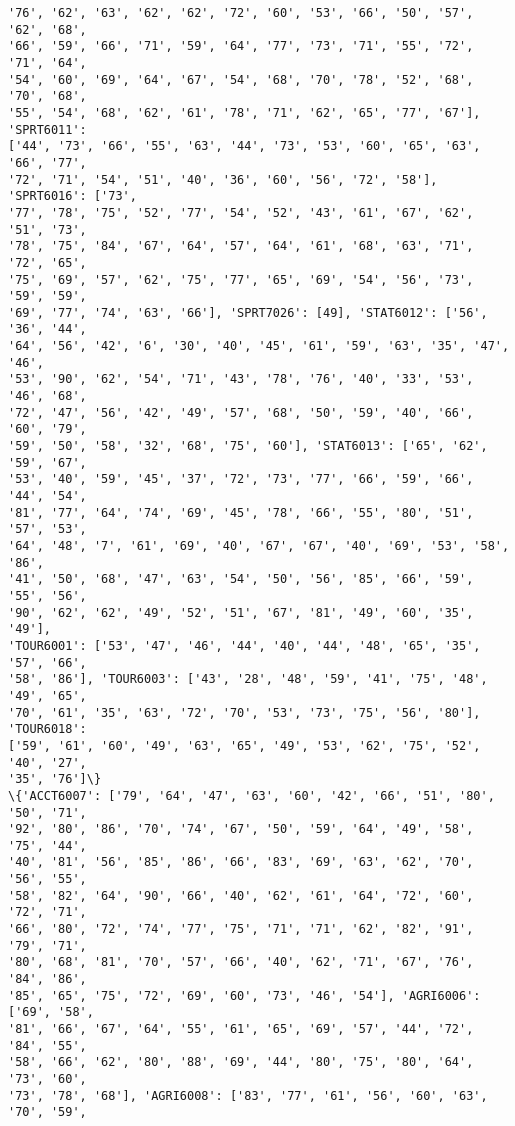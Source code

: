\documentclass[11pt]{article}
\begin{document}
\begin{Verbatim}[commandchars=\\\{\}]
'76', '62', '63', '62', '62', '72', '60', '53', '66', '50', '57', '62', '68',
'66', '59', '66', '71', '59', '64', '77', '73', '71', '55', '72', '71', '64',
'54', '60', '69', '64', '67', '54', '68', '70', '78', '52', '68', '70', '68',
'55', '54', '68', '62', '61', '78', '71', '62', '65', '77', '67'], 'SPRT6011':
['44', '73', '66', '55', '63', '44', '73', '53', '60', '65', '63', '66', '77',
'72', '71', '54', '51', '40', '36', '60', '56', '72', '58'], 'SPRT6016': ['73',
'77', '78', '75', '52', '77', '54', '52', '43', '61', '67', '62', '51', '73',
'78', '75', '84', '67', '64', '57', '64', '61', '68', '63', '71', '72', '65',
'75', '69', '57', '62', '75', '77', '65', '69', '54', '56', '73', '59', '59',
'69', '77', '74', '63', '66'], 'SPRT7026': [49], 'STAT6012': ['56', '36', '44',
'64', '56', '42', '6', '30', '40', '45', '61', '59', '63', '35', '47', '46',
'53', '90', '62', '54', '71', '43', '78', '76', '40', '33', '53', '46', '68',
'72', '47', '56', '42', '49', '57', '68', '50', '59', '40', '66', '60', '79',
'59', '50', '58', '32', '68', '75', '60'], 'STAT6013': ['65', '62', '59', '67',
'53', '40', '59', '45', '37', '72', '73', '77', '66', '59', '66', '44', '54',
'81', '77', '64', '74', '69', '45', '78', '66', '55', '80', '51', '57', '53',
'64', '48', '7', '61', '69', '40', '67', '67', '40', '69', '53', '58', '86',
'41', '50', '68', '47', '63', '54', '50', '56', '85', '66', '59', '55', '56',
'90', '62', '62', '49', '52', '51', '67', '81', '49', '60', '35', '49'],
'TOUR6001': ['53', '47', '46', '44', '40', '44', '48', '65', '35', '57', '66',
'58', '86'], 'TOUR6003': ['43', '28', '48', '59', '41', '75', '48', '49', '65',
'70', '61', '35', '63', '72', '70', '53', '73', '75', '56', '80'], 'TOUR6018':
['59', '61', '60', '49', '63', '65', '49', '53', '62', '75', '52', '40', '27',
'35', '76']\}
\{'ACCT6007': ['79', '64', '47', '63', '60', '42', '66', '51', '80', '50', '71',
'92', '80', '86', '70', '74', '67', '50', '59', '64', '49', '58', '75', '44',
'40', '81', '56', '85', '86', '66', '83', '69', '63', '62', '70', '56', '55',
'58', '82', '64', '90', '66', '40', '62', '61', '64', '72', '60', '72', '71',
'66', '80', '72', '74', '77', '75', '71', '71', '62', '82', '91', '79', '71',
'80', '68', '81', '70', '57', '66', '40', '62', '71', '67', '76', '84', '86',
'85', '65', '75', '72', '69', '60', '73', '46', '54'], 'AGRI6006': ['69', '58',
'81', '66', '67', '64', '55', '61', '65', '69', '57', '44', '72', '84', '55',
'58', '66', '62', '80', '88', '69', '44', '80', '75', '80', '64', '73', '60',
'73', '78', '68'], 'AGRI6008': ['83', '77', '61', '56', '60', '63', '70', '59',

\end{Verbatim}
\end{document}
